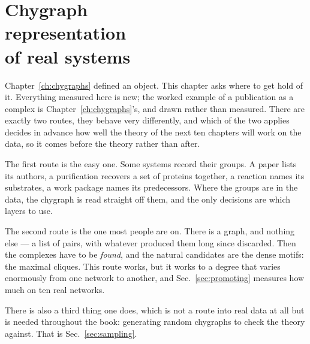 \chapter[Chygraph representation of real systems]{Chygraph\\representation\\of real systems}
\label{ch:data}

Chapter~\ref{ch:chygraphs} defined an object. This chapter asks where to
get hold of it. Everything measured here is new; the
worked example of a publication as a complex is Chapter~\ref{ch:chygraphs}'s,
and drawn rather than measured. There are exactly two routes, they behave very differently, and
which of the two applies decides in advance how well the theory of the next ten
chapters will work on the data, so it comes before the theory rather than
after.

The first route is the easy one. Some systems record their groups. A paper
lists its authors, a purification recovers a set of proteins together, a
reaction names its substrates, a work package names its predecessors. Where the
groups are in the data, the chygraph is read straight off them, and the only
decisions are which layers to use.

The second route is the one most people are on. There is a graph, and nothing
else --- a list of pairs, with whatever produced them long since discarded. Then
the complexes have to be \emph{found}, and the natural candidates are the dense
motifs: the maximal cliques. This route works, but it works to a degree that
varies enormously from one network to another, and Sec.~\ref{sec:promoting}
measures how much on ten real networks.

There is also a third thing one does, which is not a route into real data at
all but is needed throughout the book: generating random chygraphs to check the
theory against. That is Sec.~\ref{sec:sampling}.

